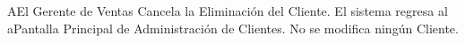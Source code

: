 \begin{UCtrayectoriaA}{A}{El Gerente de Ventas Cancela la Eliminación del Cliente.}
\UCpaso El sistema regresa al aPantalla Principal de Administración de Clientes. No se modifica ningún Cliente. 
\end{UCtrayectoriaA}


